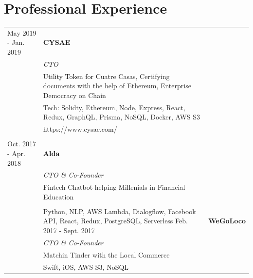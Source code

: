 \documentclass[11pt]{article}
\begin{document}
\section*{Professional Experience}
\begin{tabularx}{\textwidth}{lX}
  May 2019 - Jan. 2019   & \textbf{CYSAE} \\
                         & \textit{CTO} \\[1mm]
                         & Utility Token for Cuatre Casas, Certifying documents with the help of
                           Ethereum, Enterprise Democracy on Chain\\
                         & Tech: Solidty, Ethereum, Node, Express, React, Redux,
                           GraphQL, Prisma, NoSQL, Docker,  AWS S3 \\
                         & https://www.cysae.com/  \\\\
  Oct. 2017 - Apr. 2018  & \textbf{Alda} \\
                         & \textit{CTO \& Co-Founder} \\[1mm]
                         & Fintech Chatbot helping Millenials in Financial Education\\\\
                         & Python, NLP, AWS Lambda, Dialogflow, Facebook API, React,
                           Redux, PostgreSQL, Serverless
  Feb. 2017 - Sept. 2017 & \textbf{WeGoLoco} \\
                         & \textit{CTO \& Co-Founder} \\[1mm]
                         & Matchin Tinder with the Local Commerce \\
                         & Swift, iOS, AWS S3, NoSQL 

  
  
  
  
  

\end{tabularx}
\end{document}
